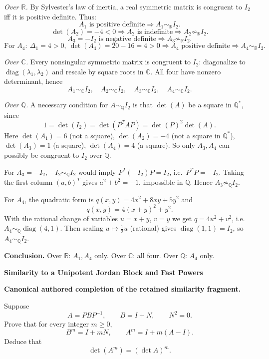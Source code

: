\begin{solution}
\emph{Over $\mathbb R$.} By Sylvester's law of inertia, a real symmetric matrix is congruent to $I_2$ iff it is positive definite.
Thus:
\[
A_1 \text{ is positive definite} \Rightarrow A_1\sim_{\mathbb R} I_2.
\]
\[
\det(A_2)=-4<0 \Rightarrow A_2 \text{ is indefinite} \Rightarrow A_2\not\sim_{\mathbb R} I_2.
\]
\[
A_3=-I_2 \text{ is negative definite} \Rightarrow A_3\not\sim_{\mathbb R} I_2.
\]
\[
\text{For }A_4:\ \Delta_1=4>0,\ \det(A_4)=20-16=4>0 \Rightarrow A_4 \text{ positive definite} \Rightarrow A_4\sim_{\mathbb R} I_2.
\]

\emph{Over $\mathbb C$.} Every nonsingular symmetric matrix is congruent to $I_2$: diagonalize to $\operatorname{diag}(\lambda_1,\lambda_2)$ and rescale by square roots in $\mathbb C$.
All four have nonzero determinant, hence
\[
A_1\sim_{\mathbb C} I_2,\quad A_2\sim_{\mathbb C} I_2,\quad A_3\sim_{\mathbb C} I_2,\quad A_4\sim_{\mathbb C} I_2.
\]

\emph{Over $\mathbb Q$.} A necessary condition for $A\sim_{\mathbb Q} I_2$ is that $\det(A)$ be a square in $\mathbb Q^*$, since
\[
1=\det(I_2)=\det(P^TAP)=\det(P)^2\det(A).
\]
Here $\det(A_1)=6$ (not a square), $\det(A_2)=-4$ (not a square in $\mathbb Q^*$), $\det(A_3)=1$ (a square), $\det(A_4)=4$ (a square).
So only $A_3,A_4$ can possibly be congruent to $I_2$ over $\mathbb Q$.

For $A_3=-I_2$, $-I_2\sim_{\mathbb Q} I_2$ would imply $P^T(-I_2)P=I_2$, i.e.\ $P^TP=-I_2$.
Taking the first column $(a,b)^T$ gives $a^2+b^2=-1$, impossible in $\mathbb Q$.
Hence $A_3\not\sim_{\mathbb Q} I_2$.

For $A_4$, the quadratic form is $q(x,y)=4x^2+8xy+5y^2$ and
\[
q(x,y)=4(x+y)^2+y^2.
\]
With the rational change of variables $u=x+y$, $v=y$ we get $q=4u^2+v^2$, i.e.\ $A_4\sim_{\mathbb Q}\operatorname{diag}(4,1)$.
Then scaling $u\mapsto \tfrac12 u$ (rational) gives $\operatorname{diag}(1,1)=I_2$, so $A_4\sim_{\mathbb Q} I_2$.

\medskip
\noindent
\textbf{Conclusion.}
Over $\mathbb R$: $A_1,A_4$ only.
Over $\mathbb C$: all four.
Over $\mathbb Q$: $A_4$ only.
\end{solution}

\begin{problem}[CP-I-0089]
\label{prob:cp-i-0089}
\textbf{Similarity to a Unipotent Jordan Block and Fast Powers}

\textbf{Canonical authored completion of the retained similarity fragment.}

\hspace*{1.5em}Suppose
\[
A=PBP^{-1},\qquad B=I+N,\qquad N^2=0.
\]
Prove that for every integer \(m\ge0\),
\[
B^m=I+mN,
\qquad
A^m=I+m(A-I).
\]
Deduce that
\[
\det(A^m)=(\det A)^m.
\]
\end{problem}

